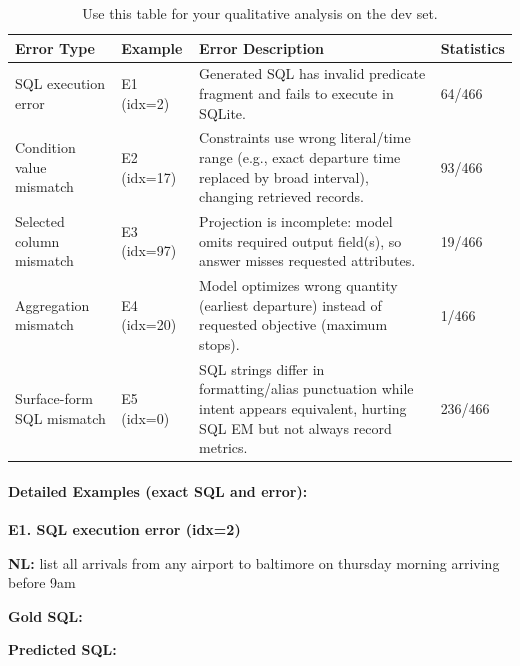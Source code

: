 \documentclass{article}
\begin{document}
\begin{table}
  \centering
  \begin{tabular}{p{2.5cm}p{2.3cm}p{5.3cm}p{2.2cm}}
    \toprule
    \textbf{Error Type}& \textbf{Example} & \textbf{Error Description} & \textbf{Statistics} \\
    \midrule
    SQL execution error & E1 (idx=2) & Generated SQL has invalid predicate fragment and fails to execute in SQLite. & 64/466 \\
    Condition value mismatch & E2 (idx=17) & Constraints use wrong literal/time range (e.g., exact departure time replaced by broad interval), changing retrieved records. & 93/466 \\
    Selected column mismatch & E3 (idx=97) & Projection is incomplete: model omits required output field(s), so answer misses requested attributes. & 19/466 \\
    Aggregation mismatch & E4 (idx=20) & Model optimizes wrong quantity (earliest departure) instead of requested objective (maximum stops). & 1/466 \\
    Surface-form SQL mismatch & E5 (idx=0) & SQL strings differ in formatting/alias punctuation while intent appears equivalent, hurting SQL EM but not always record metrics. & 236/466 \\
    \bottomrule
  \end{tabular}
  \label{tab:qualitative}
  \caption{Use this table for your qualitative analysis on the dev
  set.}\label{tab: qualitative}
\end{table}

\paragraph{Detailed Examples (exact SQL and error):}

\textbf{E1. SQL execution error (idx=2)}

\textbf{NL:} list all arrivals from any airport to baltimore on thursday morning arriving before 9am

\textbf{Gold SQL:}
{\footnotesize\ttfamily{}\par}

\textbf{Predicted SQL:}
{\footnotesize\ttfamily{}\par}
\end{document}
